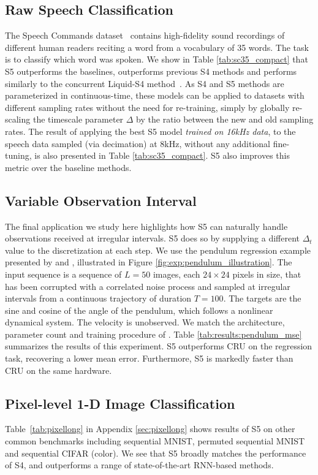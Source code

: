 \subsection{Raw Speech Classification}
\label{subsec:speech}
The Speech Commands dataset~\citep{warden2018speech} contains high-fidelity sound recordings of different human readers reciting a word from a vocabulary of 35 words.  The task is to classify which word was spoken.  We show in Table \ref{tab:sc35_compact} that S5 outperforms the baselines, outperforms previous S4 methods and performs similarly to the concurrent Liquid-S4 method~\citep{hasani2022liquid}. As S4 and S5 methods are parameterized in continuous-time, these models can be applied to datasets with different sampling rates without the need for re-training, simply by globally re-scaling the timescale parameter $\Delta$ by the ratio between the new and old sampling rates.  The result of applying the best S5 model \emph{trained on 16kHz data}, to the speech data sampled (via decimation) at 8kHz, without any additional fine-tuning, is also presented in Table \ref{tab:sc35_compact}.  S5 also improves this metric over the baseline methods. 

\subsection{Variable Observation Interval}
\label{sec:exp:variable}
The final application we study here highlights how S5 can naturally handle observations received at irregular intervals.  S5 does so by supplying a different $\Delta_t$ value to the discretization at each step.  We use the pendulum regression example presented by \citet{becker2019recurrent} and \citet{schirmer2022modeling}, illustrated in Figure \ref{fig:exp:pendulum_illustration}.  The input sequence is a sequence of $L=50$ images, each $24 \times 24$ pixels in size, that has been corrupted with a correlated noise process and sampled at irregular intervals from a continuous trajectory of duration $T=100$.  The targets are the sine and cosine of the angle of the pendulum, which follows a nonlinear dynamical system.  The velocity is unobserved.  We match the architecture, parameter count and training procedure of \citet{schirmer2022modeling}.  Table \ref{tab:results:pendulum_mse} summarizes the results of this experiment.  S5 outperforms CRU on the regression task, recovering a lower mean error.  Furthermore, S5 is markedly faster than CRU on the same hardware.  

\subsection{Pixel-level 1-D Image Classification}
\label{subsec:pixel}
Table~\ref{tab:pixellong} in Appendix \ref{sec:pixellong} shows results of S5 on other common benchmarks including sequential MNIST, permuted sequential MNIST and sequential CIFAR (color).  We see that S5 broadly matches the performance of S4, and outperforms a range of state-of-the-art RNN-based methods.  

